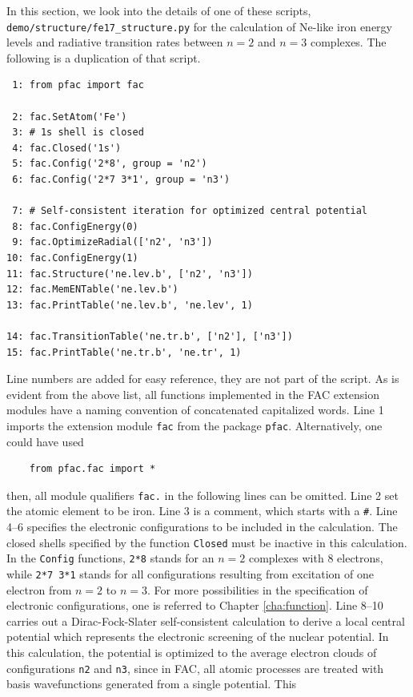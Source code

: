 \documentclass[twoside,letterpaper]{refrep}
\begin{document}
In this section, we look into the details of one of these scripts,
\verb|demo/structure/fe17_structure.py| for the calculation of Ne-like iron
energy levels and radiative transition rates between $n = 2$ and $n = 3$
complexes. The following is a duplication of that script.
\begin{verbatim}
 1: from pfac import fac

 2: fac.SetAtom('Fe')
 3: # 1s shell is closed
 4: fac.Closed('1s')
 5: fac.Config('2*8', group = 'n2')
 6: fac.Config('2*7 3*1', group = 'n3')

 7: # Self-consistent iteration for optimized central potential
 8: fac.ConfigEnergy(0)
 9: fac.OptimizeRadial(['n2', 'n3'])
10: fac.ConfigEnergy(1)
11: fac.Structure('ne.lev.b', ['n2', 'n3'])
12: fac.MemENTable('ne.lev.b')
13: fac.PrintTable('ne.lev.b', 'ne.lev', 1)

14: fac.TransitionTable('ne.tr.b', ['n2'], ['n3'])
15: fac.PrintTable('ne.tr.b', 'ne.tr', 1)
\end{verbatim}
Line numbers are added for easy reference, they are not part of the script. 
As is evident from the above list, all functions implemented in the FAC
extension modules have a naming convention of concatenated capitalized words.
Line 1 imports the extension module \verb|fac| from the package \verb|pfac|.
Alternatively, one could have used
\begin{verbatim}
    from pfac.fac import *
\end{verbatim}
then, all module qualifiers \verb|fac.| in the following lines can be omitted.
Line 2 set the atomic element to be iron. Line 3 is a comment, which starts
with a \verb|#|. Line 4--6 specifies the electronic configurations to be
included in the calculation. The closed shells specified by the function
\verb|Closed| must be inactive in this calculation. In the \verb|Config|
functions, \verb|2*8| stands for an $n = 2$ complexes with 8 electrons, while
\verb|2*7 3*1| stands for all configurations resulting from excitation of one
electron from $n = 2$ to $n = 3$. For more possibilities in the specification
of electronic configurations, one is referred to Chapter \ref{cha:function}.
Line 8--10 carries out a Dirac-Fock-Slater self-consistent calculation to
derive a local central potential which represents the electronic screening of
the nuclear potential. In this calculation, the potential is optimized to the
average electron clouds of configurations \verb|n2| and \verb|n3|, since in
FAC, all atomic processes are treated with basis wavefunctions generated from
a single potential. This
\end{document}
